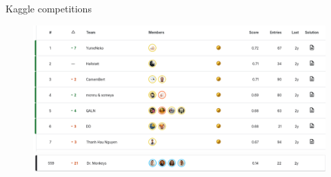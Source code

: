 \begin{frame}{Kaggle competitions}
    \begin{figure}
        \begin{minipage}[t]{\linewidth}
            \centering
            \vspace{0pt}
            \includegraphics[width=\textwidth]{img/competition-2.png}
        \end{minipage}
        \vspace{0.5cm}
        \begin{minipage}[t]{\linewidth}
            \centering
            \vspace{0pt}
            \includegraphics[width=\textwidth]{img/competition-1.png}
        \end{minipage}
    \end{figure}
\end{frame}